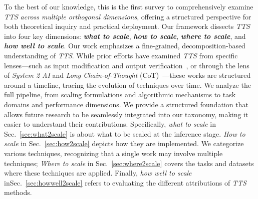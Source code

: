To the best of our knowledge, this is the first survey to comprehensively examine \textit{TTS} \emph{across multiple orthogonal dimensions}, offering a structured perspective for both theoretical inquiry and practical deployment.
Our framework dissects \textit{TTS} into four key dimensions: \textbf{\textit{what to scale}}, \textbf{\textit{how to scale}}, \textbf{\textit{where to scale}}, and \textbf{\textit{how well to scale}}. Our work emphasizes a fine-grained, decomposition-based understanding of \textit{TTS}. 
While prior efforts have examined \textit{TTS} from specific lenses—such as input modification and output verification~\citep{snell2024scaling}, or through the lens of \textit{System 2 AI} and \textit{Long Chain-of-Thought} (CoT)~\citep{li2025system, ji2025test, chen2025reasoningerasurveylong}—these works are structured around a timeline, tracing the evolution of techniques over time.
We analyze the full pipeline, from scaling formulations and algorithmic mechanisms to task domains and performance dimensions. We provide a structured foundation that allows future research to be seamlessly integrated into our taxonomy, making it easier to understand their contributions. 
Specifically, \textit{what to scale} in Sec.~\ref{sec:what2scale} is about what to be scaled at the inference stage. \textit{How to scale} in Sec.~\ref{sec:how2scale} depicts how they are implemented. We categorize various techniques, recognizing that a single work may involve multiple techniques; 
\textit{Where to scale} in Sec.~\ref{sec:where2scale} covers the tasks and datasets where these techniques are applied. Finally, \textit{how well to scale} inSec.~\ref{sec:howwell2scale} refers to evaluating the different attributions of \textit{TTS} methods. 
